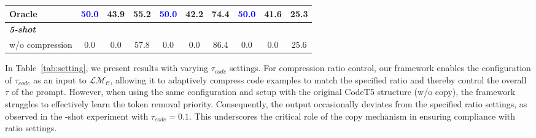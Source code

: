 \begin{table*}[]
\begin{tabular}{lccccccccc}
Oracle                                              & \textcolor{blue}{50.0} & 43.9                 & 55.2                 & \textcolor{blue}{50.0} & 42.2                 & 74.4                 & \textcolor{blue}{50.0} & 41.6                 & 25.3                 \\ \hline
\textit{\textbf{5-shot}}                            & \multicolumn{1}{l}{}         & \multicolumn{1}{l}{} & \multicolumn{1}{l}{} & \multicolumn{1}{l}{}         & \multicolumn{1}{l}{} & \multicolumn{1}{l}{} & \multicolumn{1}{l}{}         & \multicolumn{1}{l}{} & \multicolumn{1}{l}{} \\
w/o compression                                     & 0.0                          & 0.0                  & 57.8                 & 0.0                          & 0.0                  & 86.4                 & 0.0                          & 0.0                  & 25.6                 \\ \hline
\end{tabular}
\end{table*}







In Table~\ref{tab:setting}, we present results with varying $\tau_{code}$ settings. For compression ratio control, our framework enables the configuration of $\tau_{code}$ as an input to $\mathcal{LM_C}$, allowing it to adaptively compress code examples to match the specified ratio and thereby control the overall $\tau$ of the prompt. However, when using the same configuration and setup with the original CodeT5 structure (w/o copy), the framework struggles to effectively learn the token removal priority. Consequently, the output occasionally deviates from the specified ratio settings, as observed in the -shot experiment with $\tau_{code}=0.1$. This underscores the critical role of the copy mechanism in ensuring compliance with ratio settings.

